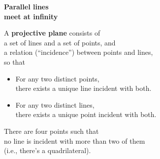 \documentclass[14pt]{chalkfjord}
\newcommand{\setbackgroundpicture}[1]{%
\usebackgroundtemplate{
\begin{pgfpicture}{0in}{0in}{\paperwidth}{\paperheight}
\pgfputat{\pgfxy(0,0)}{\texttt{[image: \#1]}}
\color{white}
\end{pgfpicture}
}
}
\newcommand{\clearbackgroundpicture}{\usebackgroundtemplate{}}
\begin{document}

\setbackgroundpicture{Railroad-Tracks-Perspective.jpg}
\begin{frame}[nofills,label=what-is-plane]
  \color{black}\Large\textbf{}
  \pause
  \vfill
  \vspace{0.5in}
  \color{white}\huge
  \begin{center}
  \textbf{Parallel lines} \\
  \textbf{meet at infinity}
  \end{center}
\end{frame}
\clearbackgroundpicture

\begin{frame}
  \begin{definition}
   A \textbf{projective plane} consists of \\
   \quad a set of lines and a set of points, and \\
   \quad a relation (``incidence'') between points and lines, \\
   so that
   \begin{itemize}
   \item For any two distinct points, \\
     there exists a unique line incident with both.
   \item For any two distinct lines, \\
     there exists a unique point incident with both.
   \end{itemize}
  \end{definition}

  \pause

  There are four points such that \\
  \quad no line is incident with more than two of them \\
  \pause\quad (i.e., there's a quadrilateral).

\end{frame}
\end{document}

